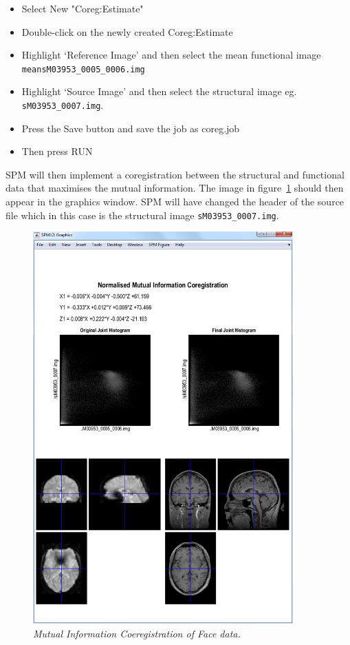 \documentclass[a4paper,titlepage]{book}
\newcommand{\bi}{\begin{itemize}}
\newcommand{\ei}{\end{itemize}}
\begin{document}
\bi
\item{Select New "Coreg:Estimate"}
\item{Double-click on the newly created Coreg:Estimate}
\item{Highlight `Reference Image' and then select the
 mean functional image
\verb!meansM03953_0005_0006.img!}
\item{Highlight `Source Image' and then select 
the structural image eg. \verb!sM03953_0007.img!.}
\item{Press the Save button and save the job as 
{\sf coreg.job}}
\item{Then press RUN}
\ei
SPM will then implement a coregistration between the structural and functional data that maximises the mutual information. The image in figure~\ref{aud_coreg} should then appear 
in the graphics window. SPM will have changed the header 
of the source file which in this case is the 
structural image \verb!sM03953_0007.img!.
\begin{figure}
\begin{center}
\includegraphics[width=100mm]{faces/coreg}
\caption{\em Mutual Information Coeregistration of Face data. \label{aud_coreg}}
\end{center}
\end{figure}
\end{document}
